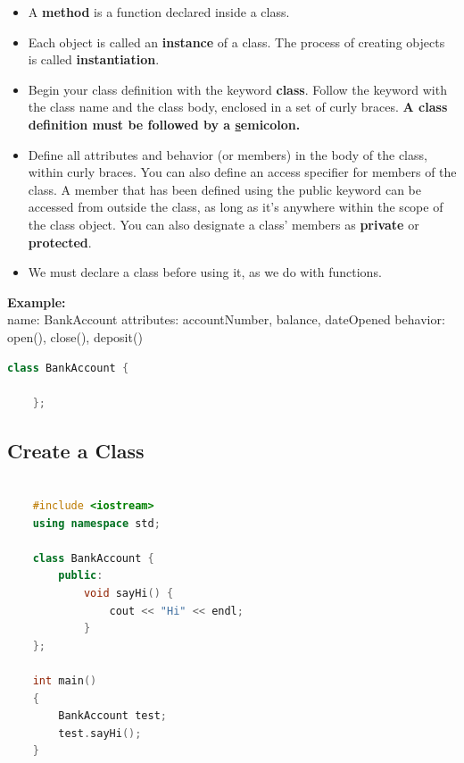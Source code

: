 \documentclass[12pt , a4paper]{article}
\begin{document}
\begin{itemize}
		\item A \textbf{method} is a function declared inside a class.\\
		\item Each object is called an \textbf{instance} of a class. The process of creating objects is called \textbf{instantiation}.\\
		\item Begin your class definition with the keyword  \textbf{class}. Follow the keyword with the class name and the class body, enclosed in a set of curly braces. \textbf{A class definition must be followed by a \underline semicolon.}\\
		\item Define all attributes and behavior (or members) in the body of the class, within curly braces. You can also define an access specifier for members of the class. A member that has been defined using the public keyword can be accessed from outside the class, as long as it's anywhere within the scope of the class object. You can also designate a class' members as  \textbf{private} or  \textbf{protected}. \\
		\item We must declare a class before using it, as we do with functions.\\
	\end{itemize}

	\begin{tcolorbox}
	\textbf{Example:}\\
	name: BankAccount
	attributes: accountNumber, balance, dateOpened
	behavior: open(), close(), deposit()
	\end{tcolorbox}

	\begin{lstlisting}[language=C++]
	class BankAccount {
	
	};
	\end{lstlisting}
	\subsection{Create a Class}
	\begin{lstlisting}[language=C++]

	#include <iostream>
	using namespace std;
	
	class BankAccount {
	    public:
	        void sayHi() {
	            cout << "Hi" << endl;
	        }
	};
	
	int main() 
	{
	    BankAccount test;
	    test.sayHi();
	}
	\end{lstlisting}
\end{document}
